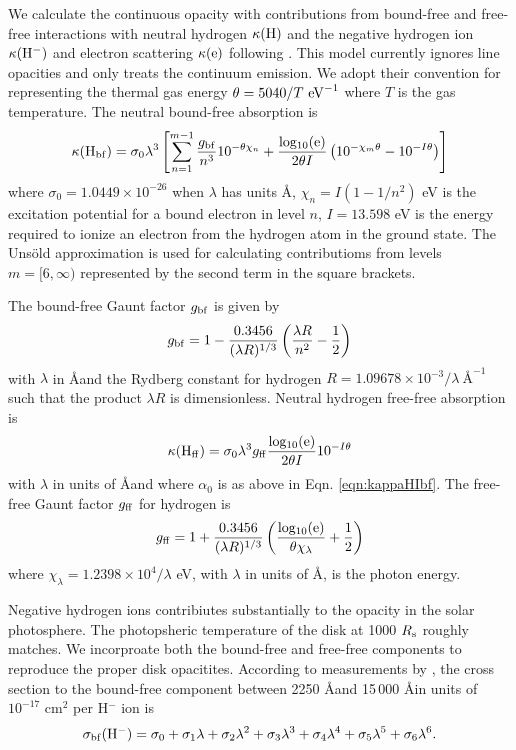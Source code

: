 We calculate the continuous opacity with contributions from bound-free and free-free interactions with neutral hydrogen $\kappa({\rm H})$ and the negative hydrogen ion $\kappa({\rm H^-})$ and electron scattering $\kappa({\rm e})$ following \citet{Gray21}.
This model currently ignores line opacities and only treats the continuum emission.
We adopt their convention for representing the thermal gas energy $\theta = 5040/T\ {\rm eV}^{-1}$ where $T$ is the gas temperature.
The neutral bound-free absorption is 
\begin{equation}\label{eqn:kappaHIbf}
    \kappa({\rm H_{bf}}) = \sigma_0 \lambda^3  \left[ \sum_{n=1}^{m-1} \frac{g_{\rm bf}}{n^3}10^{-\theta \chi_n} + \frac{\rm log_{10}(e)}{2\theta I} \left(10^{-\chi_m \theta} - 10^{-I\theta} \right) \right]
\end{equation}
where $\sigma_0 = 1.0449 \times 10^{-26}$ when $\lambda$ has units \AA, $\chi_{n} = I(1-1/n^2)$ eV is the excitation potential for a bound electron in level $n$, $I=13.598$ eV is the energy required to ionize an electron from the hydrogen atom in the ground state.
The Uns\"old approximation is used for calculating contributioms from levels $m=[6, \infty)$ represented by the second term in the square brackets.

The bound-free Gaunt factor $g_{\rm bf}$ is given by
\begin{equation}\label{eqn:gauntHIbf}
    g_{\rm bf} = 1 - \frac{0.3456}{(\lambda R)^{1/3}} \left( \frac{\lambda R}{n^2} - \frac{1}{2} \right)
\end{equation}
with $\lambda$ in \AA and the Rydberg constant for hydrogen $R = 1.09678 \times 10^{-3} / \lambda \ {\text{\AA}^{-1}}$ such that the product $\lambda R$ is dimensionless. Neutral hydrogen free-free absorption is
\begin{equation}\label{eqn:kappaHIff}
    \kappa({\rm H_{ff}}) = \sigma_0 \lambda^3 g_{\rm ff} \frac{\rm log_{10}(e)}{2\theta I} 10^{-I\theta}
\end{equation}
with $\lambda$ in units of \AA and where $\alpha_0$ is as above in Eqn. \ref{eqn:kappaHIbf}. The free-free Gaunt factor $g_{\rm ff}$ for hydrogen is
\begin{equation}
    g_{\rm ff} = 1 + \frac{0.3456}{(\lambda R)^{1/3}} \left( \frac{\rm log_{10}(e)}{\theta \chi_{\lambda}} + \frac{1}{2} \right)
\end{equation}
where $\chi_{\lambda} = 1.2398 \times 10^4 / \lambda$ eV, with $\lambda$ in units of \AA, is the photon energy.

Negative hydrogen ions contribiutes substantially to the opacity in the solar photosphere.
The photopsheric temperature of the \citet{SirkoGoodman03} disk at 1000 $R_{\rm s}$ roughly matches.
We incorproate both the bound-free and free-free components to reproduce the proper disk opacitites.
According to measurements by \citet{Wishart79}, the cross section to the bound-free component between 2250 \AA and 15\,000 \AA in units of $10^{-17}$ cm$^2$ per H$^-$ ion is
\begin{equation}
    \sigma_{\rm bf}(\rm H^-) = \sigma_0 + \sigma_1 \lambda + \sigma_2 \lambda^2 + \sigma_3 \lambda^3 + \sigma_4 \lambda^4 + \sigma_5 \lambda^5 + \sigma_6 \lambda^6.
\end{equation}

